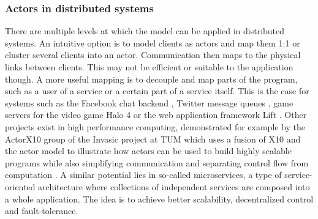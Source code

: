 \documentclass[A4]{article}
\begin{document}
\subsubsection{Actors in distributed systems}
There are multiple levels at which the model can be applied in distributed systems. An intuitive option is to model clients as actors and map them 1:1 or cluster several clients into an actor. Communication then maps to the physical links between clients. This may not be efficient or suitable to the application though. A more useful mapping is to decouple and map parts of the program, such as a user of a service or a certain part of a service itself. This is the case for systems such as the Facebook chat backend \cite{Facebook}, Twitter message queues \cite{Twitter}, game servers for the video game Halo 4 \cite{Halo4} or the web application framework Lift \cite[p.~14]{Agha2016:2}. Other projects exist in high performance computing, demonstrated for example by the ActorX10 group of the Invasic project at TUM which uses a fusion of X10 and the actor model to illustrate how actors can be used to build highly scalable programs while also simplifying communication and separating control flow from computation \cite[p.~4]{Roloff:2016:AAL:2931028.2931033}. 
A similar potential lies in so-called microservices, a type of service-oriented architecture where collections of independent services are composed into a whole application. The idea is to achieve better scalability, decentralized control and fault-tolerance. \cite{MicroS}
\end{document}
